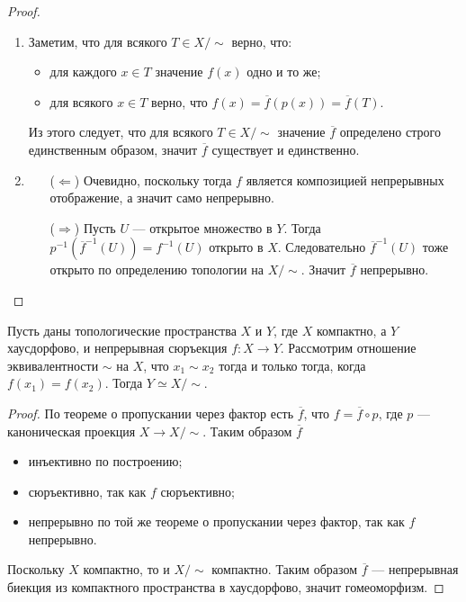 \documentclass[12pt,a4paper]{article}
\begin{document}
    \begin{proof}\ 
        \begin{enumerate}
            \item Заметим, что для всякого $T \in X/{\sim}$ верно, что:
            \begin{itemize}
                \item для каждого $x \in T$ значение $f(x)$ одно и то же;
                \item для всякого $x \in T$ верно, что $f(x) = \overline{f}(p(x)) = \overline{f}(T)$.
            \end{itemize}
            Из этого следует, что для всякого $T \in X/{\sim}$ значение $\overline{f}$ определено строго единственным образом, значит $\overline{f}$ существует и единственно.
            
            \item
            \begin{itemize}
                \item[($\Leftarrow$)] Очевидно, поскольку тогда $f$ является композицией непрерывных отображение, а значит само непрерывно.
                \item[($\Rightarrow$)] Пусть $U$ --- открытое множество в $Y$. Тогда $p^{-1}(\overline{f}^{-1}(U)) = f^{-1}(U)$ открыто в $X$. Следовательно $\overline{f}^{-1}(U)$ тоже открыто по определению топологии на $X/{\sim}$. Значит $\overline{f}$ непрерывно.
            \end{itemize}
        \end{enumerate}
    \end{proof}

    \begin{corollary}
        Пусть даны топологические пространства $X$ и $Y$, где $X$ компактно, а $Y$ хаусдорфово, и непрерывная сюръекция $f: X \to Y$. Рассмотрим отношение эквивалентности $\sim$ на $X$, что $x_1 \sim x_2$ тогда и только тогда, когда $f(x_1) = f(x_2)$. Тогда $Y \simeq X/{\sim}$.
    \end{corollary}

    \begin{proof}
        По теореме о пропускании через фактор есть $\overline{f}$, что $f = \overline{f} \circ p$, где $p$ --- каноническая проекция $X \to X/{\sim}$. Таким образом $\overline{f}$
        \begin{itemize}
            \item инъективно по построению;
            \item сюръективно, так как $f$ сюръективно;
            \item непрерывно по той же теореме о пропускании через фактор, так как $f$ непрерывно.
        \end{itemize}
        Поскольку $X$ компактно, то и $X/{\sim}$ компактно. Таким образом $\overline{f}$ --- непрерывная биекция из компактного пространства в хаусдорфово, значит гомеоморфизм.
    \end{proof}
\end{document}
